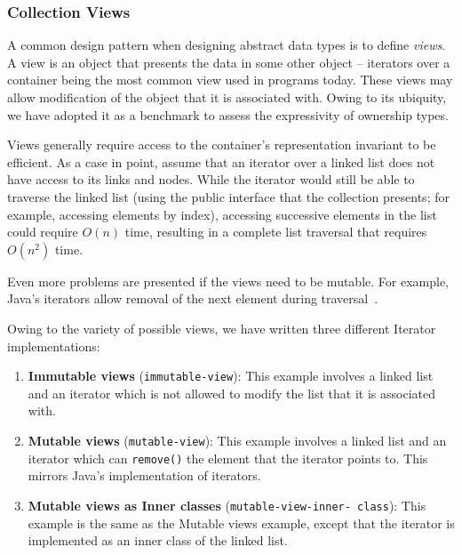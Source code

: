 \documentclass{acm_proc_article-sp}
\begin{document}
\subsubsection{Collection Views}
\label{subsubsec:views}

A common design pattern when designing abstract data types is to define
\emph{views}. A view is an object that presents the data in some other
object -- iterators over a container being the most common view used in
programs today. These views may allow modification of the object that it
is associated with. Owing to its ubiquity, we have adopted it as a benchmark
to assess the expressivity of ownership types.

Views generally require access to the container's representation invariant to be
efficient. As a case in point, assume that an iterator over a linked list does
not have access to its links and nodes. While the iterator would still be able
to traverse the linked list (using the public interface that the collection
presents; for example, accessing elements by index), accessing successive
elements in the list could require $O(n)$ time, resulting in a complete list
traversal that requires $O(n^2)$ time.

Even more problems are presented if the views need to be mutable. For example,
Java's iterators allow removal of the next element during
traversal~\cite{java8java_util_iterator}.

Owing to the variety of possible views, we have written three different
Iterator implementations:

\begin{enumerate}
	\item \textbf{Immutable views} (\texttt{immutable-view}): This example
		involves a linked list and an iterator which is not allowed to modify
		the list that it is associated with.

	\item \label{item:mutable-views} \textbf{Mutable views}
		(\texttt{mutable-view}): This example involves a linked list and an
		iterator which can \lstinline|remove()| the element that the iterator
		points to. This mirrors Java's implementation of iterators.

	\item \label{item:mutable-views-as-inner-classes} \textbf{Mutable views as
		Inner classes} (\texttt{mutable-view-inner-\linebreak~class}): This
		example is the same as the Mutable views example, except that the
		iterator is implemented as an inner class of the linked list.
\end{enumerate}
\end{document}
